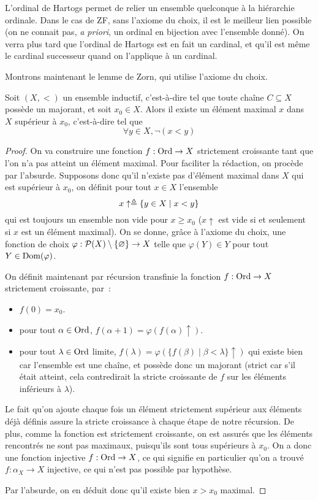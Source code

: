 L'ordinal de Hartogs permet de relier un ensemble quelconque à la hiérarchie
ordinale. Dans le cas de ZF, sans l'axiome du choix, il est le meilleur lien
possible (on ne connait pas, \textit{a priori}, un ordinal en bijection avec
l'ensemble donné). On verra plus tard que l'ordinal de Hartogs est en fait un
cardinal, et qu'il est même le cardinal successeur quand on l'applique à un
cardinal.

Montrons maintenant le lemme de Zorn, qui utilise l'axiome du choix.

\begin{theorem}\label{thm.ordi.Zorn}
  Soit $(X,<)$ un ensemble inductif, c'est-à-dire tel que toute chaîne
  $C\subseteq X$ possède un majorant, et soit $x_0\in X$. Alors il existe un
  élément maximal $x$ dans $X$ supérieur à $x_0$, c'est-à-dire tel que
  \[\forall y \in X, \lnot (x < y)\]
\end{theorem}

\begin{proof}
  On va construire une fonction $f : \operatorname{Ord} \to X$ strictement croissante tant que
  l'on n'a pas atteint un élément maximal. Pour faciliter la rédaction, on
  procède par l'absurde. Supposons donc qu'il n'existe pas d'élément maximal
  dans $X$ qui est supérieur à $x_0$, on définit pour tout $x\in X$ l'ensemble
  \[x\uparrow\triangleq \{y \in X \mid x < y\}\]
  qui est toujours un ensemble non vide pour $x \geq x_0$ ($x\uparrow$ est vide
  si et seulement si $x$ est un élément maximal). On se donne, grâce à l'axiome
  du choix, une fonction de choix
  $\varphi : \mathcal{P}(X)\setminus\{\varnothing\}\to X$ telle que
  $\varphi(Y) \in Y$ pour tout $Y\in\operatorname{Dom}(\varphi)$.

  On définit maintenant par récursion transfinie la fonction $f : \operatorname{Ord}\to X$
  strictement croissante, par~:
  \begin{itemize}
  \item $f(0) = x_0$.
  \item pour tout $\alpha\in\operatorname{Ord}$, $f(\alpha+1) = \varphi(f(\alpha)\uparrow)$.
  \item pour tout $\lambda\in\operatorname{Ord}$ limite,
    $f(\lambda) = \varphi(\{f(\beta)\mid \beta < \lambda\}\uparrow)$ qui existe
    bien car l'ensemble est une chaîne, et possède donc un majorant (strict car
    s'il était atteint, cela contredirait la stricte croissante de $f$
    sur les éléments inférieurs à $\lambda$).
  \end{itemize}
  Le fait qu'on ajoute chaque fois un élément strictement supérieur aux éléments
  déjà définis assure la stricte croissance à chaque étape de notre récursion.
  De plus, comme la fonction est strictement croissante, on est assurés que
  les éléments rencontrés ne sont pas maximaux, puisqu'ils sont tous supérieurs
  à $x_0$. On a donc une fonction injective $f : \operatorname{Ord} \to X$, ce qui signifie en
  particulier qu'on a trouvé $f : \alpha_X\to X$ injective, ce qui n'est pas
  possible par hypothèse.

  Par l'absurde, on en déduit donc qu'il existe bien $x > x_0$ maximal.
\end{proof}

